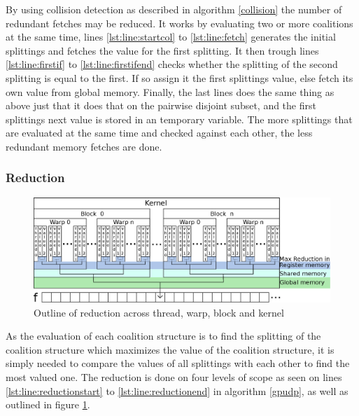 \documentclass{aamas2012}
\begin{document}
By using collision detection as described in algorithm \ref{collision} the number of redundant fetches may be reduced.
It works by evaluating two or more coalitions at the same time, lines \ref{lst:line:startcol} to \ref{lst:line:fetch} generates
the initial splittings and fetches the value for the first splitting. It then trough lines \ref{lst:line:firstif} to \ref{lst:line:firstifend}
checks whether the splitting of the second splitting is equal to the first. 
If so assign it the first splittings value, else fetch its own value from global memory. 
Finally, the last lines does the same thing as above just that it does that on the pairwise disjoint subset, 
and the first splittings next value is stored in an temporary variable. 
The more splittings that are evaluated at the same time and checked against each other, the less redundant memory fetches are done.


\subsubsection{Reduction} \label{reduction} %
\begin{figure}
\centering
\includegraphics[width=\linewidth]{reduction}
\caption{Outline of reduction across thread, warp, block and kernel \label{fig:reduction}}
\end{figure}

As the evaluation of each coalition structure is to find the splitting 
of the coalition structure which maximizes the value of the coalition structure,
it is simply needed to compare the values of all splittings with each other to find the most valued one. 
The reduction is done on four levels of scope as seen on lines \ref{lst:line:reductionstart} to \ref{lst:line:reductionend} in algorithm \ref{gpudp},
as well as outlined in figure \ref{fig:reduction}. 
\end{document}
